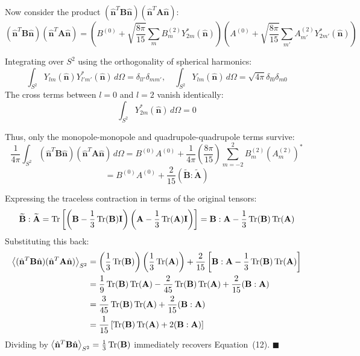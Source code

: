 \documentclass[11pt,a4paper]{article}
\theoremstyle{definition}
\begin{document}
Now consider the product $(\hat{\mathbf{n}}^T \mathbf{B} \hat{\mathbf{n}})(\hat{\mathbf{n}}^T \mathbf{A} \hat{\mathbf{n}})$:
\begin{equation}
(\hat{\mathbf{n}}^T \mathbf{B} \hat{\mathbf{n}})(\hat{\mathbf{n}}^T \mathbf{A} \hat{\mathbf{n}}) = \left( B^{(0)} + \sqrt{\frac{8\pi}{15}} \sum_m B^{(2)}_m Y_{2m}^*(\hat{\mathbf{n}}) \right) \left( A^{(0)} + \sqrt{\frac{8\pi}{15}} \sum_{m'} A^{(2)}_{m'} Y_{2m'}^*(\hat{\mathbf{n}}) \right)
\end{equation}

Integrating over $S^2$ using the orthogonality of spherical harmonics:
\begin{equation}
\int_{S^2} Y_{lm}(\hat{\mathbf{n}}) Y_{l'm'}^*(\hat{\mathbf{n}}) \, d\Omega = \delta_{ll'} \delta_{mm'}, \quad \int_{S^2} Y_{lm}(\hat{\mathbf{n}}) \, d\Omega = \sqrt{4\pi} \delta_{l0} \delta_{m0}
\end{equation}
The cross terms between $l=0$ and $l=2$ vanish identically:
\begin{equation}
\int_{S^2} Y_{2m}^*(\hat{\mathbf{n}}) \, d\Omega = 0
\end{equation}

Thus, only the monopole-monopole and quadrupole-quadrupole terms survive:
\begin{equation}
\frac{1}{4\pi} \int_{S^2} (\hat{\mathbf{n}}^T \mathbf{B} \hat{\mathbf{n}})(\hat{\mathbf{n}}^T \mathbf{A} \hat{\mathbf{n}}) \, d\Omega = B^{(0)} A^{(0)} + \frac{1}{4\pi} \left( \frac{8\pi}{15} \right) \sum_{m=-2}^2 B^{(2)}_m (A^{(2)}_m)^*
\end{equation}
\begin{equation}
= B^{(0)} A^{(0)} + \frac{2}{15} \left( \widetilde{\mathbf{B}} : \widetilde{\mathbf{A}} \right)
\end{equation}

Expressing the traceless contraction in terms of the original tensors:
\begin{equation}
\widetilde{\mathbf{B}} : \widetilde{\mathbf{A}} = \Tr\left[ \left(\mathbf{B} - \frac{1}{3}\Tr(\mathbf{B})\mathbf{I}\right) \left(\mathbf{A} - \frac{1}{3}\Tr(\mathbf{A})\mathbf{I}\right) \right] = \mathbf{B}:\mathbf{A} - \frac{1}{3}\Tr(\mathbf{B})\Tr(\mathbf{A})
\end{equation}
Substituting this back:
\begin{align}
\ev{(\hat{\mathbf{n}}^T \mathbf{B} \hat{\mathbf{n}})(\hat{\mathbf{n}}^T \mathbf{A} \hat{\mathbf{n}})}_{S^2} &= \left( \frac{1}{3}\Tr(\mathbf{B}) \right) \left( \frac{1}{3}\Tr(\mathbf{A}) \right) + \frac{2}{15} \left[ \mathbf{B}:\mathbf{A} - \frac{1}{3}\Tr(\mathbf{B})\Tr(\mathbf{A}) \right] \\
&= \frac{1}{9}\Tr(\mathbf{B})\Tr(\mathbf{A}) - \frac{2}{45}\Tr(\mathbf{B})\Tr(\mathbf{A}) + \frac{2}{15} (\mathbf{B}:\mathbf{A}) \\
&= \frac{3}{45}\Tr(\mathbf{B})\Tr(\mathbf{A}) + \frac{2}{15} (\mathbf{B}:\mathbf{A}) \\
&= \frac{1}{15} \left[ \Tr(\mathbf{B})\Tr(\mathbf{A}) + 2 (\mathbf{B}:\mathbf{A}) \right]
\end{align}
Dividing by $\ev{\hat{\mathbf{n}}^T \mathbf{B} \hat{\mathbf{n}}}_{S^2} = \frac{1}{3}\Tr(\mathbf{B})$ immediately recovers Equation~(12). $\blacksquare$
\end{document}

